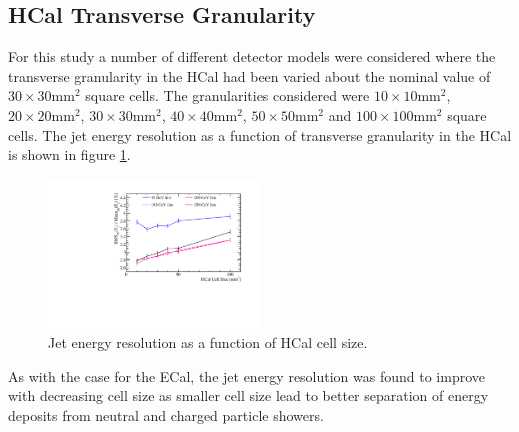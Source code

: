 \subsection{HCal Transverse Granularity}
\label{sec:hcalcells}
For this study a number of different detector models were considered where the transverse granularity in the HCal had been varied about the nominal value of $30 \times 30 \text{mm}^{2}$ square cells.  The granularities considered were $10 \times 10 \text{mm}^{2}$, $20 \times 20 \text{mm}^{2}$, $30 \times 30 \text{mm}^{2}$, $40 \times 40 \text{mm}^{2}$, $50 \times 50 \text{mm}^{2}$ and $100 \times 100 \text{mm}^{2}$ square cells.  The jet energy resolution as a function of transverse granularity in the HCal is shown in figure \ref{fig:hcalcellsize}.

\begin{figure}
\centering
\includegraphics[width=0.5\textwidth]{OptimisationStudies/Plots/JetEnergyResolutions/JER_vs_HCalCellSize.pdf}
\caption[Jet energy resolution as a function of HCal cell size.]{Jet energy resolution as a function of HCal cell size.}
\label{fig:hcalcellsize}
\end{figure}

As with the case for the ECal, the jet energy resolution was found to improve with decreasing cell size as smaller cell size lead to better separation of energy deposits from neutral and charged particle showers.

